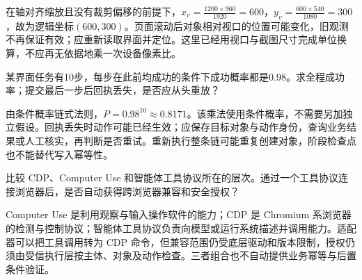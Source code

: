 \begin{exercises}
\begin{exercise}
\begin{solution}
在轴对齐缩放且没有裁剪偏移的前提下，$x_v=\frac{1200\times960}{1920}=600$，$y_v=\frac{600\times540}{1080}=300$，故为逻辑坐标$(600,300)$。页面滚动后对象相对视口的位置可能变化，旧观测不再保证有效；应重新读取界面并定位。这里已经用视口与截图尺寸完成单位换算，不应再无依据地乘一次设备像素比。
\end{solution}
\end{exercise}

\begin{exercise} 某界面任务有10步，每步在此前均成功的条件下成功概率都是0.98。求全程成功率；提交最后一步后回执丢失，是否应从头重放？

\begin{solution}

由条件概率链式法则，$P=0.98^{10}\approx0.8171$。该乘法使用条件概率，不需要另加独立假设。回执丢失时动作可能已经生效；应保存目标对象与动作身份，查询业务结果或人工核实，再判断是否重试。重新执行整条链可能重复创建对象，阶段检查点也不能替代写入幂等性。
\end{solution}
\end{exercise}

\begin{exercise}\optional 比较 CDP、Computer Use 和智能体工具协议所在的层次。通过一个工具协议连接浏览器后，是否自动获得跨浏览器兼容和安全授权？

\begin{solution}
Computer Use 是利用观察与输入操作软件的能力；CDP 是 Chromium 系浏览器的检测与控制协议；智能体工具协议负责向模型或运行系统描述并调用能力。适配器可以把工具调用转为 CDP 命令，但兼容范围仍受底层驱动和版本限制，授权仍须由受信执行层按主体、对象及动作检查。三者组合也不自动提供业务幂等与后置条件验证。
\end{solution}
\end{exercise}

\end{exercises}
